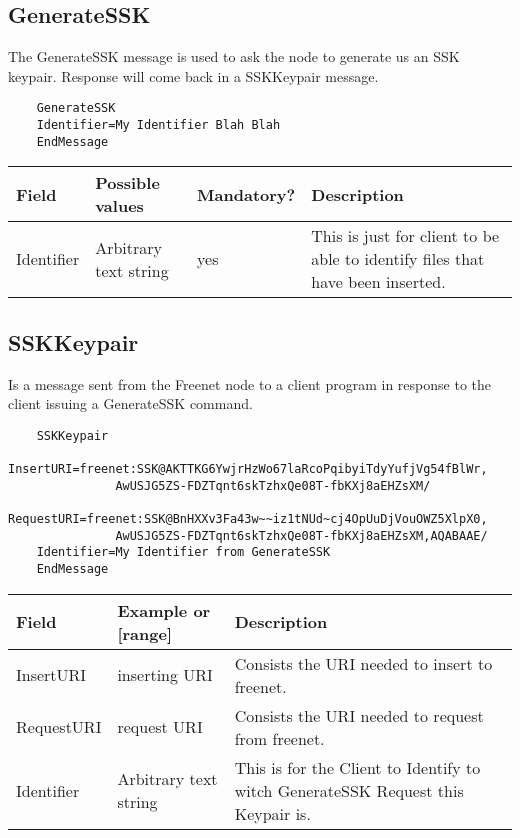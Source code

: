 \subsection{GenerateSSK}
The GenerateSSK message is used to ask the node to generate us an SSK keypair. Response will come back in a SSKKeypair message.
\begin{verbatim}
    GenerateSSK
    Identifier=My Identifier Blah Blah
    EndMessage
\end{verbatim}
\begin{tabularx}{\textwidth}{p{3cm}|p{2cm}|p{2.5cm}|p{5.5cm}}
\toprule
    Field & Possible values & Mandatory? & Description \\
\midrule 
Identifier & Arbitrary text string & yes & This is just for client to be able to identify files that have been inserted. \\
\bottomrule
\end{tabularx}
\newpage
\subsection{SSKKeypair}
Is a message sent from the Freenet node to a client program in response to the client issuing a GenerateSSK command.
\begin{verbatim}
    SSKKeypair
    InsertURI=freenet:SSK@AKTTKG6YwjrHzWo67laRcoPqibyiTdyYufjVg54fBlWr,
               AwUSJG5ZS-FDZTqnt6skTzhxQe08T-fbKXj8aEHZsXM/
    RequestURI=freenet:SSK@BnHXXv3Fa43w~~iz1tNUd~cj4OpUuDjVouOWZ5XlpX0,
               AwUSJG5ZS-FDZTqnt6skTzhxQe08T-fbKXj8aEHZsXM,AQABAAE/
    Identifier=My Identifier from GenerateSSK
    EndMessage
\end{verbatim}
\begin{tabularx}{\textwidth}{p{3cm}|p{3cm}|p{7.5cm}}
\toprule
    Field & Example or [range] & Description \\
\midrule 
InsertURI & inserting URI & Consists the URI needed to insert to freenet. \\
\addlinespace
\hline
\addlinespace
RequestURI & request URI & Consists the URI needed to request from freenet. \\
\addlinespace
\hline
\addlinespace
Identifier & Arbitrary text string & This is for the Client to Identify to witch GenerateSSK Request this Keypair is. \\
\bottomrule
\end{tabularx}
\newpage
